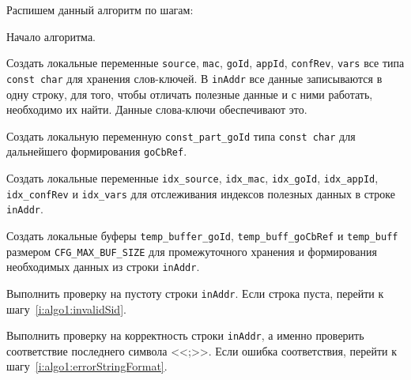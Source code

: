 Распишем данный алгоритм по шагам:
\begin{enumerate_step}
    \item Начало алгоритма.
    \item \label{i:algo1:initData} Создать локальные переменные \lstinline{source}, \lstinline{mac}, \lstinline{goId}, \lstinline{appId}, \lstinline{confRev}, \lstinline{vars} все типа
    \lstinline{const char} для хранения слов-ключей. В \lstinline{inAddr} все данные
    записываются в одну строку, для того, чтобы отличать полезные данные и с ними работать,
    необходимо их найти. Данные слова-ключи обеспечивают это.

    \item Создать локальную переменную \lstinline{const_part_goId} типа \lstinline{const char} для дальнейшего формирования \lstinline{goCbRef}.

    \item \label{i:algo1:wordsPointers} Создать локальные переменные \lstinline{idx_source}, \lstinline{idx_mac}, \lstinline{idx_goId}, \lstinline{idx_appId}, \lstinline{idx_confRev} и \lstinline{idx_vars} для отслеживания индексов полезных данных в строке \lstinline{inAddr}.
    \item \label{i:algo1:createBufs} Создать локальные буферы \lstinline{temp_buffer_goId}, \lstinline{temp_buff_goCbRef} и \lstinline{temp_buff} размером \lstinline{CFG_MAX_BUF_SIZE} для промежуточного хранения и формирования необходимых данных из строки \lstinline{inAddr}.

    \item Выполнить проверку на пустоту строки \lstinline{inAddr}. Если строка пуста, перейти
    к шагу~\ref{i:algo1:invalidSid}.
    \item Выполнить проверку на корректность строки \lstinline{inAddr}, а именно проверить соответствие последнего символа <<;>>. Если ошибка соответствия, перейти
    к шагу~\ref{i:algo1:errorStringFormat}.


\end{enumerate_step}
